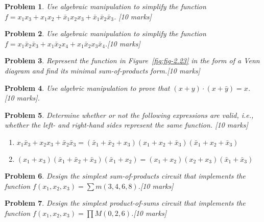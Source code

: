 \documentclass{article}
\newtheorem{prob}{Problem}
\newcommand{\bx}{\bar{x}}
\begin{document}
\begin{prob}
Use algebraic manipulation to simplify the function $f = x_1x_3 + x_1x_2 + \bx_1 x_2 x_3 + \bx_1 \bx_2 \bx_3$. [10 marks]
\end{prob}

\begin{prob}
Use algebraic manipulation to simplify the function $f = x_1\bx_2\bx_3 + x_1\bx_2x_4 + x_1\bx_2 x_3\bx_4$.[10 marks]
\end{prob}


\begin{prob}
Represent the function in Figure~\ref{fig:fig-2.23} in the form of a Venn diagram and find its minimal sum-of-products form.[10 marks]
\end{prob}

\begin{prob}
Use algebric manipulation to prove that $(x+y)\cdot(x+\bar{y}) = x$. [10 marks].
\end{prob}

\begin{prob}
Determine whether or not the following expressions are valid, i.e., whether the left- and
right-hand sides represent the same function.
[10 marks]
\begin{enumerate}
    \item $x_1 \bx_3 + x_2 x_3 + \bx_2 \bx_3 = (\bx_1 + \bx_2 + x_3)(x_1 + x_2 + \bx_3)(\bx_1 + x_2 + \bx_3)$
    \item $(x_1 + x_3)(\bx_1 + \bx_2 + \bx_3)(\bx_1 + x_2) = (x_1 + x_2)(x_2 + x_3)(\bx_1 + \bx_3)$
\end{enumerate}
\end{prob}

\begin{prob}
Design the simplest sum-of-products circuit that implements the function $f (x_1 , x_2 , x_3 ) = \sum m(3, 4, 6, 8)$.[10 marks]
\end{prob}

\begin{prob}
Design the simplest product-of-sums circuit that implements the function $f (x_1 , x_2 , x_3 ) = \prod M (0, 2, 6)$.[10 marks]
\end{prob}




\end{document}

